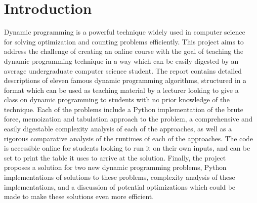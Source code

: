 \chapter{Introduction}
\setcounter{page}{1}
Dynamic programming is a powerful technique widely used in computer science for solving optimization and counting problems efficiently.
This project aims to address the challenge of creating an online course with the goal of teaching the dynamic programming technique in a way which can be easily digested by an average undergraduate computer science student.
The report contains detailed descriptions of eleven famous dynamic programming algorithms,
structured in a format which can be used as teaching material by a lecturer looking to give a class on dynamic programming to students with no prior knowledge of the technique.
Each of the problems include a Python implementation of the brute force, memoization and tabulation approach to the problem, a comprehensive and easily digestable complexity analysis of each of the approaches, as well as a rigorous comparative analysis of the runtimes of each of the approaches.
The code is accessible online for students looking to run it on their own inputs, and can be set to print the table it uses to arrive at the solution.
Finally, the project proposes a solution for two new dynamic programming problems, Python implementations of solutions to these problems, complexity analysis of these implementations, and a discussion of potential optimizations which could be made to make these solutions even more efficient.
